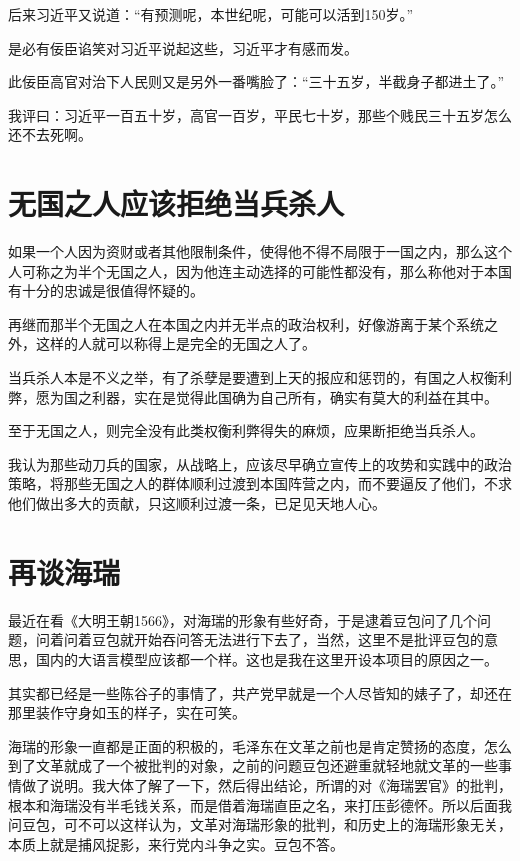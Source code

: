 \documentclass[12pt,oneside]{book}
\begin{document}
后来习近平又说道：“有预测呢，本世纪呢，可能可以活到150岁。”

是必有佞臣谄笑对习近平说起这些，习近平才有感而发。

此佞臣高官对治下人民则又是另外一番嘴脸了：“三十五岁，半截身子都进土了。”

我评曰：习近平一百五十岁，高官一百岁，平民七十岁，那些个贱民三十五岁怎么还不去死啊。


\chapter{无国之人应该拒绝当兵杀人}
如果一个人因为资财或者其他限制条件，使得他不得不局限于一国之内，那么这个人可称之为半个无国之人，因为他连主动选择的可能性都没有，那么称他对于本国有十分的忠诚是很值得怀疑的。

再继而那半个无国之人在本国之内并无半点的政治权利，好像游离于某个系统之外，这样的人就可以称得上是完全的无国之人了。

当兵杀人本是不义之举，有了杀孽是要遭到上天的报应和惩罚的，有国之人权衡利弊，愿为国之利器，实在是觉得此国确为自己所有，确实有莫大的利益在其中。

至于无国之人，则完全没有此类权衡利弊得失的麻烦，应果断拒绝当兵杀人。

我认为那些动刀兵的国家，从战略上，应该尽早确立宣传上的攻势和实践中的政治策略，将那些无国之人的群体顺利过渡到本国阵营之内，而不要逼反了他们，不求他们做出多大的贡献，只这顺利过渡一条，已足见天地人心。



\chapter{再谈海瑞}
最近在看《大明王朝1566》，对海瑞的形象有些好奇，于是逮着豆包问了几个问题，问着问着豆包就开始吞问答无法进行下去了，当然，这里不是批评豆包的意思，国内的大语言模型应该都一个样。这也是我在这里开设本项目的原因之一。

其实都已经是一些陈谷子的事情了，共产党早就是一个人尽皆知的婊子了，却还在那里装作守身如玉的样子，实在可笑。

海瑞的形象一直都是正面的积极的，毛泽东在文革之前也是肯定赞扬的态度，怎么到了文革就成了一个被批判的对象，之前的问题豆包还避重就轻地就文革的一些事情做了说明。我大体了解了一下，然后得出结论，所谓的对《海瑞罢官》的批判，根本和海瑞没有半毛钱关系，而是借着海瑞直臣之名，来打压彭德怀。所以后面我问豆包，可不可以这样认为，文革对海瑞形象的批判，和历史上的海瑞形象无关，本质上就是捕风捉影，来行党内斗争之实。豆包不答。
\end{document}
